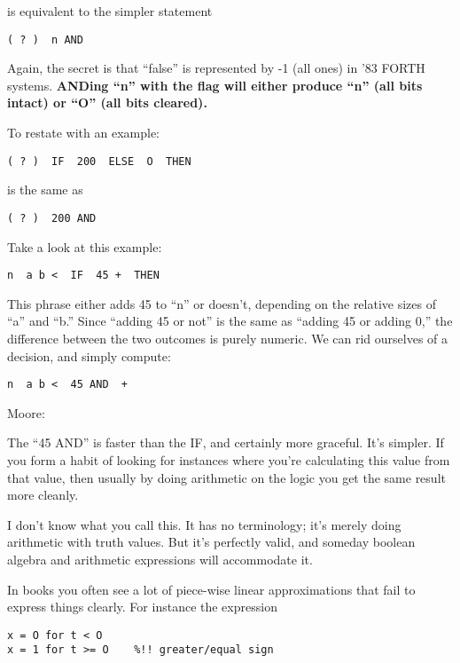 is equivalent to the simpler statement

\begin{verbatim}
( ? )  n AND
\end{verbatim}

Again, the secret is that ``false'' is represented by -1 (all ones) in '83
FORTH systems. \bf{AND}ing ``n'' with the flag will either produce ``n'' (all
bits intact) or ``O'' (all bits cleared).

To restate with an example:

\begin{verbatim}
( ? )  IF  200  ELSE  O  THEN
\end{verbatim}

is the same as

\begin{verbatim}
( ? )  200 AND
\end{verbatim}

Take a look at this example:

\begin{verbatim}
n  a b <  IF  45 +  THEN
\end{verbatim}

This phrase either adds 45 to ``n'' or doesn't, depending on the relative
sizes of ``a'' and ``b.'' Since ``adding 45 or not'' is the same as ``adding 45
or adding 0,'' the difference between the two outcomes is purely numeric.
We can rid ourselves of a decision, and simply compute:

\begin{verbatim}
n  a b <  45 AND  +
\end{verbatim}

Moore:

The ``45 AND'' is faster than the IF, and certainly more graceful. It's
simpler. If you form a habit of looking for instances where you're
calculating this value from that value, then usually by doing arithmetic on
the logic you get the same result more cleanly.

I don't know what you call this. It has no terminology; it's merely doing
arithmetic with truth values. But it's perfectly valid, and someday boolean
algebra and arithmetic expressions will accommodate it.

In books you often see a lot of piece-wise linear approximations that fail to
express things clearly. For instance the expression

\begin{verbatim}
x = O for t < O
x = 1 for t >= O	%!! greater/equal sign
\end{verbatim}

